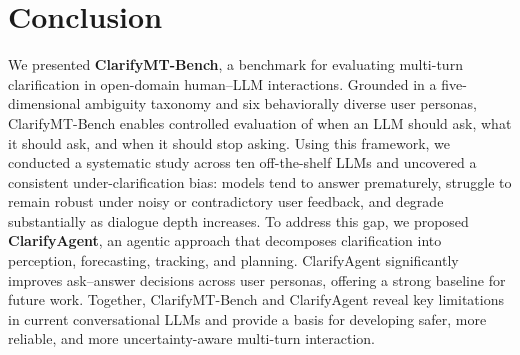 \documentclass[sigconf]{acmart}
\newcommand{\dataset}{ClarifyMT-Bench\xspace}
\newcommand{\model}{ClarifyAgent\xspace}
\begin{document}

\section{Conclusion}

We presented \textbf{\dataset}, a benchmark for evaluating multi-turn clarification in open-domain human–LLM interactions. Grounded in a five-dimensional ambiguity taxonomy and six behaviorally diverse user personas, \dataset{} enables controlled evaluation of when an LLM should ask, what it should ask, and when it should stop asking. Using this framework, we conducted a systematic study across ten off-the-shelf LLMs and uncovered a consistent {under-clarification bias}: models tend to answer prematurely, struggle to remain robust under noisy or contradictory user feedback, and degrade substantially as dialogue depth increases.
To address this gap, we proposed \textbf{\model}, an agentic approach  that decomposes clarification into perception, forecasting, tracking, and planning. ClarifyAgent significantly improves ask–answer decisions across user personas, offering a strong baseline for future work.
Together, \dataset{} and \model{} reveal key limitations in current conversational LLMs and provide a basis for developing safer, more reliable, and more uncertainty-aware multi-turn interaction.









\newpage

$ $

\newpage

\appendix
\end{document}
